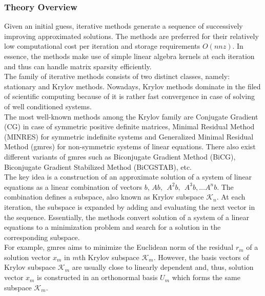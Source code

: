 \subsubsection{Theory Overview}
\label{subseq:iterative-theory}


Given an initial guess, iterative methods generate a sequence of successively improving approximated solutions. The methods are preferred for their relatively low computational cost per iteration and storage requirements $O(nnz)$. In essence, the methods make use of simple linear algebra kernels  at each iteration and thus can handle matrix sparsity efficiently.\\



The family of iterative methods consists of two distinct classes, namely: stationary and Krylov methods. Nowadays, Krylov methods dominate in the filed of scientific computing because of it is rather fast convergence in case of solving of well conditioned systems.\\


The most well-known methods among the Krylov family are Conjugate Gradient (CG) in case of symmetric positive definite matrices, Minimal Residual Method (MINRES) for symmetric indefinite systems and Generalized Minimal Residual Method (\acrshort{gmres}) for non-symmetric systems of linear equations. There also exist different variants of \acrshort{gmres} such as Biconjugate Gradient Method (BiCG), Biconjugate Gradient Stabilized Method (BiCGSTAB), etc.\\


The key idea is a construction of an approximate solution of a system of linear equations as a linear combination of vectors $b$, $Ab, \:\: A^2b, \:\: A^3b, \dots A^{n}b$. The combination defines a subspace, also known as Krylov subspace $\mathcal{K}_{n}$. At each iteration, the subspace is expanded by adding and evaluating the next vector in the sequence. Essentially, the methods convert solution of a system of a linear equations to a minimization problem and search for a solution in the corresponding subspace.\\


For example, \acrshort{gmres} aims to minimize the Euclidean norm of the residual $r_{m}$ of a solution vector $x_{m}$ in $m$th Krylov subspace $\mathcal{K}_{m}$. However, the basis vectors of Krylov subspace $\mathcal{K}_{m}$ are usually close to linearly dependent and, thus, solution vector $x_{m}$ is constructed in an orthonormal basis $U_{m}$ which forms the same subspace $\mathcal{K}_{m}$.\\


